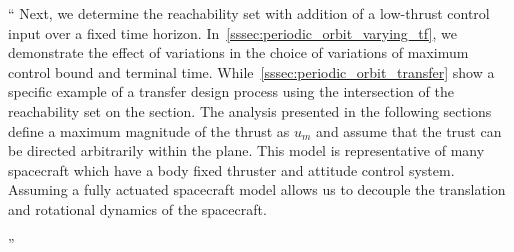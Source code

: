 \documentclass[11pt]{article}
\newenvironment{correction}{\begin{list}{}{\setlength{\leftmargin}{1cm}\setlength{\rightmargin}{1cm}}\vspace{\parsep}\item[]``}{''\end{list}}
\begin{document}
\begin{itemize}
        \begin{correction}
            Next, we determine the reachability set with addition of a low-thrust control input over a fixed time horizon.
            In~\cref{sssec:periodic_orbit_varying_tf}, we demonstrate the effect of variations in the choice of variations of maximum control bound and terminal time.
            While~\cref{sssec:periodic_orbit_transfer} show a specific example of a transfer design process using the intersection of the reachability set on the \Poincare section.
            The analysis presented in the following sections define a maximum magnitude of the thrust as \( u_{m} \) and assume that the trust can be directed arbitrarily within the plane. 
            This model is representative of many spacecraft which have a body fixed thruster and attitude control system.
            Assuming a fully actuated spacecraft model allows us to decouple the translation and rotational dynamics of the spacecraft.


\end{correction}
\end{itemize}
\end{document}
